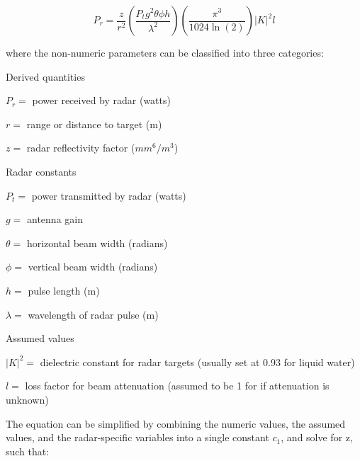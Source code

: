 \begin{multicols}{2}
\begin{equation}
    P_r = \frac{z}{r^2} \left ( \frac{P_t g^2 \theta \phi h}{\lambda^2}\right ) \left ( \frac{ \pi^3 } {1024 \ln(2)} \right ) |K|^2 l
\end{equation}

\noindent
where the non-numeric parameters can be classified into three categories:

\medskip

\begin{description}

\item Derived quantities
    \begin{description}
    \item $P_r =$ power received by radar (watts)
    \item $r =$ range or distance to target (m)
    \item $z =$ radar reflectivity factor ($mm^6/m^3$)
    \end{description}
    
\bigskip

\item Radar constants
    \begin{description}
    \item $P_t =$ power transmitted by radar (watts)
    \item $g =$ antenna gain
    \item $\theta =$ horizontal beam width (radians)
    \item $\phi =$ vertical beam width (radians)
    \item $h =$ pulse length (m)
    \item $\lambda =$ wavelength of radar pulse (m)
    \end{description}

\item Assumed values
    \begin{description}
    \item $|K|^2 =$ dielectric constant for radar targets (usually set at 0.93 for liquid water)
    \item $l =$ loss factor for beam attenuation (assumed to be 1 for if attenuation is unknown)
    \end{description}
\end{description}

The equation can be simplified by combining the numeric values, the assumed values, and the radar-specific variables into a single constant $c_1$, and solve for z, such that:


\end{multicols}
